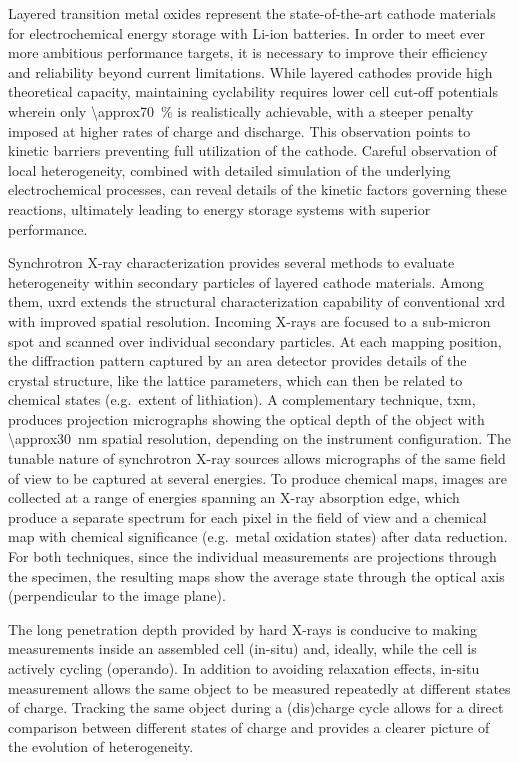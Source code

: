 \documentclass{article}
\begin{document}
Layered transition metal oxides represent the state-of-the-art cathode
materials for electrochemical energy storage with Li-ion batteries. In
order to meet ever more ambitious performance targets, it is necessary
to improve their efficiency and reliability beyond current
limitations. While layered cathodes provide high theoretical capacity,
maintaining cyclability requires lower cell cut-off potentials wherein
only \SI{\approx70}{\percent} is realistically achievable, with a
steeper penalty imposed at higher rates of charge and
discharge\cite{janek2019-2,chen2020-4}. This observation points to
kinetic barriers preventing full utilization of the cathode. Careful
observation of local heterogeneity, combined with detailed simulation
of the underlying electrochemical processes, can reveal details of the
kinetic factors governing these reactions, ultimately leading to
energy storage systems with superior performance.


Synchrotron X-ray characterization provides several methods to
evaluate heterogeneity within secondary particles of layered cathode
materials\cite{doeff2017}. Among them, \Gls{uxrd} extends the
structural characterization capability of conventional \gls{xrd} with
improved spatial resolution. Incoming X-rays are focused to a
sub-micron spot and scanned over individual secondary particles. At
each mapping position, the diffraction pattern captured by an area
detector provides details of the crystal structure, like the lattice
parameters, which can then be related to chemical states (e.g.\ extent
of lithiation). A complementary technique, \Gls{txm}, produces
projection micrographs showing the optical depth of the object with
\SI{\approx30}{nm} spatial resolution, depending on the instrument
configuration. The tunable nature of synchrotron X-ray sources allows
micrographs of the same field of view to be captured at several
energies. To produce chemical maps, images are collected at a range of
energies spanning an X-ray absorption edge, which produce a separate
spectrum for each pixel in the field of view and a chemical map with
chemical significance (e.g.\ metal oxidation states) after data
reduction. For both techniques, since the individual measurements are
projections through the specimen, the resulting maps show the average
state through the optical axis (perpendicular to the image plane).

The long penetration depth provided by hard X-rays is conducive to
making measurements inside an assembled cell (in-situ) and, ideally,
while the cell is actively cycling (operando). In addition to avoiding
relaxation effects, in-situ measurement allows the same object to be
measured repeatedly at different states of charge. Tracking the same
object during a (dis)charge cycle allows for a direct comparison
between different states of charge and provides a clearer picture of
the evolution of heterogeneity.
\end{document}
